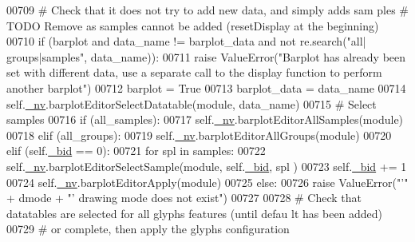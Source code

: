 \begin{DoxyCode}
00709                 \textcolor{comment}{# Check that it does not try to add new data, and simply adds sam
      ples # TODO Remove as samples cannot be added (resetDisplay at the beginning)}
00710                 \textcolor{keywordflow}{if} (barplot \textcolor{keywordflow}{and} data\_name != barplot\_data \textcolor{keywordflow}{and} \textcolor{keywordflow}{not} re.search(\textcolor{stringliteral}{"all|
      groups|samples"}, data\_name)):
00711                     \textcolor{keywordflow}{raise} ValueError(\textcolor{stringliteral}{"Barplot has already been set with different
       data, use a separate call to the display function to perform another barplot"})
00712                 barplot = \textcolor{keyword}{True}
00713                 barplot\_data = data\_name
00714                 self.\hyperlink{classnavicom_1_1navicom_1_1NaviCom_afff3fd56fa16a68bab52ba8d801e325a}{_nv}.barplotEditorSelectDatatable(module, data\_name)
00715                 \textcolor{comment}{# Select samples}
00716                 \textcolor{keywordflow}{if} (all\_samples):
00717                     self.\hyperlink{classnavicom_1_1navicom_1_1NaviCom_afff3fd56fa16a68bab52ba8d801e325a}{_nv}.barplotEditorAllSamples(module)
00718                 \textcolor{keywordflow}{elif} (all\_groups):
00719                     self.\hyperlink{classnavicom_1_1navicom_1_1NaviCom_afff3fd56fa16a68bab52ba8d801e325a}{_nv}.barplotEditorAllGroups(module)
00720                 \textcolor{keywordflow}{elif} (self.\hyperlink{classnavicom_1_1navicom_1_1NaviCom_a496d13fc4c8b73cef4f496b713d12b79}{_bid} == 0):
00721                     \textcolor{keywordflow}{for} spl \textcolor{keywordflow}{in} samples:
00722                         self.\hyperlink{classnavicom_1_1navicom_1_1NaviCom_afff3fd56fa16a68bab52ba8d801e325a}{_nv}.barplotEditorSelectSample(module, self.\hyperlink{classnavicom_1_1navicom_1_1NaviCom_a496d13fc4c8b73cef4f496b713d12b79}{_bid}, spl
      )
00723                         self.\hyperlink{classnavicom_1_1navicom_1_1NaviCom_a496d13fc4c8b73cef4f496b713d12b79}{_bid} += 1
00724                     self.\hyperlink{classnavicom_1_1navicom_1_1NaviCom_afff3fd56fa16a68bab52ba8d801e325a}{_nv}.barplotEditorApply(module)
00725             \textcolor{keywordflow}{else}:
00726                 \textcolor{keywordflow}{raise} ValueError(\textcolor{stringliteral}{"'"} + dmode + \textcolor{stringliteral}{"' drawing mode does not exist"})
00727 
00728         \textcolor{comment}{# Check that datatables are selected for all glyphs features (until defau
      lt has been added)}
00729         \textcolor{comment}{# or complete, then apply the glyphs configuration}

\end{DoxyCode}
